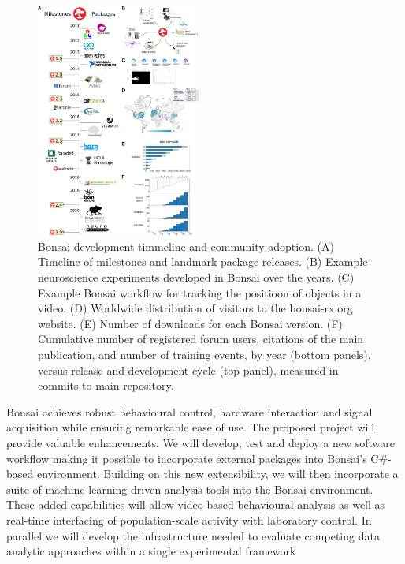 \setlength{\columnsep}{1em}
\begin{figure}
    \includegraphics[width=0.48\textwidth]{figures/roadmap-bbsrc_noCaption.png}

  \caption{Bonsai development timmeline and community adoption. (A) Timeline of
    milestones and landmark package releases. (B) Example neuroscience
    experiments developed in Bonsai over the years. (C) Example Bonsai workflow
    for tracking the positioon of objects in a video. (D) Worldwide
    distribution of visitors to the bonsai-rx.org website. (E)
    Number of downloads for each Bonsai version. (F) Cumulative number of
    registered forum users, citations of the main publication, and number of
    training events, by year (bottom panels), versus release and development
    cycle (top panel), measured in commits to main repository.}
  \label{fig:bonsai}

\end{figure}



Bonsai achieves robust behavioural control, hardware interaction and signal acquisition while ensuring remarkable ease of use.  The proposed project will provide valuable enhancements.  We will develop, test and deploy a new software workflow making it possible to incorporate external packages into Bonsai's C\#-based environment.  Building on this new extensibility, we will then incorporate a suite of machine-learning-driven analysis tools into the Bonsai environment.  These added capabilities will allow  video-based behavioural analysis as well as real-time interfacing of population-scale activity with laboratory control.  In parallel we will develop the infrastructure needed to evaluate competing data analytic approaches within a single experimental framework

